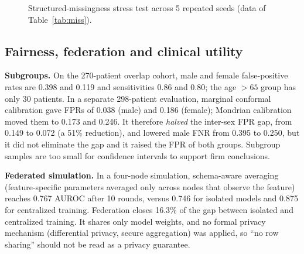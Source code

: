 \documentclass[journal]{IEEEtran}
\newcommand{\sfn}{SchemaFlexTabNet-QC}
\begin{document}
\begin{figure}[t]
\centering
{}
\caption{Structured-missingness stress test across 5 repeated seeds (data of Table~\ref{tab:miss}).}
\label{fig:miss}
\end{figure}

\subsection{Fairness, federation and clinical utility}
\textbf{Subgroups.} On the 270-patient overlap cohort, male and female false-positive rates are 0.398 and 0.119 and sensitivities 0.86 and 0.80; the age $>65$ group has only 30 patients. In a separate 298-patient evaluation, marginal conformal calibration gave FPRs of 0.038 (male) and 0.186 (female); Mondrian calibration moved them to 0.173 and 0.246. It therefore \emph{halved} the inter-sex FPR gap, from 0.149 to 0.072 (a 51\% reduction), and lowered male FNR from 0.395 to 0.250, but it did not eliminate the gap and it raised the FPR of both groups. Subgroup samples are too small for confidence intervals to support firm conclusions.

\textbf{Federated simulation.} In a four-node simulation, schema-aware averaging (feature-specific parameters averaged only across nodes that observe the feature) reaches 0.767 AUROC after 10 rounds, versus 0.746 for isolated models and 0.875 for centralized training. Federation closes 16.3\% of the gap between isolated and centralized training. It shares only model weights, and no formal privacy mechanism (differential privacy, secure aggregation) was applied, so ``no row sharing'' should not be read as a privacy guarantee.
\end{document}
